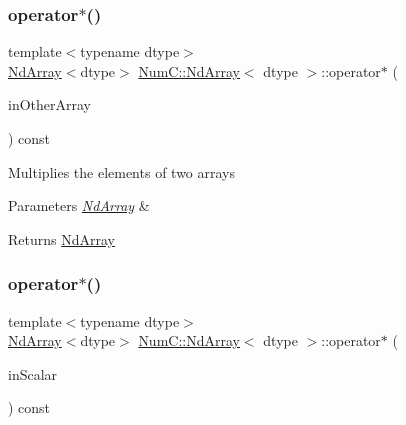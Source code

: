 \subsubsection{\texorpdfstring{operator$\ast$()}{operator*()}\hspace{0.1cm}{\footnotesize\ttfamily [1/2]}}
{\footnotesize\ttfamily template$<$typename dtype$>$ \\
\mbox{\hyperlink{class_num_c_1_1_nd_array}{Nd\+Array}}$<$dtype$>$ \mbox{\hyperlink{class_num_c_1_1_nd_array}{Num\+C\+::\+Nd\+Array}}$<$ dtype $>$\+::operator$\ast$ (\begin{DoxyParamCaption}\item[{const \mbox{\hyperlink{class_num_c_1_1_nd_array}{Nd\+Array}}$<$ dtype $>$ \&}]{in\+Other\+Array }\end{DoxyParamCaption}) const\hspace{0.3cm}{\ttfamily [inline]}}

Multiplies the elements of two arrays


\begin{DoxyParams}{Parameters}
{\em \mbox{\hyperlink{class_num_c_1_1_nd_array}{Nd\+Array}}} & \\
\hline
\end{DoxyParams}
\begin{DoxyReturn}{Returns}
\mbox{\hyperlink{class_num_c_1_1_nd_array}{Nd\+Array}} 
\end{DoxyReturn}
\mbox{\label{class_num_c_1_1_nd_array_acc8e2a1e0ed7f63df71b4e1137bd0edd}} 
\subsubsection{\texorpdfstring{operator$\ast$()}{operator*()}\hspace{0.1cm}{\footnotesize\ttfamily [2/2]}}
{\footnotesize\ttfamily template$<$typename dtype$>$ \\
\mbox{\hyperlink{class_num_c_1_1_nd_array}{Nd\+Array}}$<$dtype$>$ \mbox{\hyperlink{class_num_c_1_1_nd_array}{Num\+C\+::\+Nd\+Array}}$<$ dtype $>$\+::operator$\ast$ (\begin{DoxyParamCaption}\item[{dtype}]{in\+Scalar }\end{DoxyParamCaption}) const\hspace{0.3cm}{\ttfamily [inline]}}

